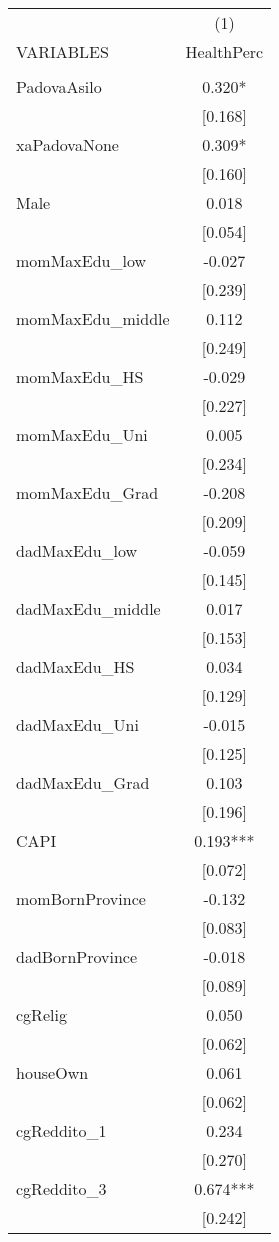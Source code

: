 \documentclass[]{article}
\begin{document}
\begin{tabular}{lc} \hline
 & (1) \\
VARIABLES & HealthPerc \\ \hline
 &  \\
PadovaAsilo & 0.320* \\
 & [0.168] \\
xaPadovaNone & 0.309* \\
 & [0.160] \\
Male & 0.018 \\
 & [0.054] \\
momMaxEdu\_low & -0.027 \\
 & [0.239] \\
momMaxEdu\_middle & 0.112 \\
 & [0.249] \\
momMaxEdu\_HS & -0.029 \\
 & [0.227] \\
momMaxEdu\_Uni & 0.005 \\
 & [0.234] \\
momMaxEdu\_Grad & -0.208 \\
 & [0.209] \\
dadMaxEdu\_low & -0.059 \\
 & [0.145] \\
dadMaxEdu\_middle & 0.017 \\
 & [0.153] \\
dadMaxEdu\_HS & 0.034 \\
 & [0.129] \\
dadMaxEdu\_Uni & -0.015 \\
 & [0.125] \\
dadMaxEdu\_Grad & 0.103 \\
 & [0.196] \\
CAPI & 0.193*** \\
 & [0.072] \\
momBornProvince & -0.132 \\
 & [0.083] \\
dadBornProvince & -0.018 \\
 & [0.089] \\
cgRelig & 0.050 \\
 & [0.062] \\
houseOwn & 0.061 \\
 & [0.062] \\
cgReddito\_1 & 0.234 \\
 & [0.270] \\
cgReddito\_3 & 0.674*** \\
 & [0.242] \\

\end{tabular}
\end{document}
